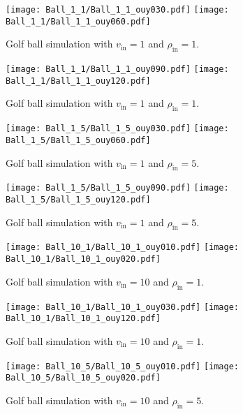 \documentclass[twocolumn]{myarticle}
\numberwithin{equation}{section}
\begin{document}
\begin{figure*}[ht]
    \centering
    \texttt{[image: Ball\_1\_1/Ball\_1\_1\_ouy030.pdf]}
    \texttt{[image: Ball\_1\_1/Ball\_1\_1\_ouy060.pdf]}
    \caption{Golf ball simulation with $ v_\text{in} = 1 $ and $ \rho_\text{in} = 1 $.}
    \label{fig:ball1}
\end{figure*}

\begin{figure*}[ht]
    \centering
    \texttt{[image: Ball\_1\_1/Ball\_1\_1\_ouy090.pdf]}
    \texttt{[image: Ball\_1\_1/Ball\_1\_1\_ouy120.pdf]}
    \caption{Golf ball simulation with $ v_\text{in} = 1 $ and $ \rho_\text{in} = 1 $.}
    \label{fig:ball2}
\end{figure*}


\begin{figure*}[ht]
    \centering
    \texttt{[image: Ball\_1\_5/Ball\_1\_5\_ouy030.pdf]}
    \texttt{[image: Ball\_1\_5/Ball\_1\_5\_ouy060.pdf]}
    \caption{Golf ball simulation with $ v_\text{in} = 1 $ and $ \rho_\text{in} = 5 $.}
    \label{fig:ball3}
\end{figure*}

\begin{figure*}[ht]
    \centering
    \texttt{[image: Ball\_1\_5/Ball\_1\_5\_ouy090.pdf]}
    \texttt{[image: Ball\_1\_5/Ball\_1\_5\_ouy120.pdf]}
    \caption{Golf ball simulation with $ v_\text{in} = 1 $ and $ \rho_\text{in} = 5 $.}
    \label{fig:ball4}
\end{figure*}


\begin{figure*}[ht]
    \centering
    \texttt{[image: Ball\_10\_1/Ball\_10\_1\_ouy010.pdf]}
    \texttt{[image: Ball\_10\_1/Ball\_10\_1\_ouy020.pdf]}
    \caption{Golf ball simulation with $ v_\text{in} = 10 $ and $ \rho_\text{in} = 1 $.}
    \label{fig:ball5}
\end{figure*}

\begin{figure*}[ht]
    \centering
    \texttt{[image: Ball\_10\_1/Ball\_10\_1\_ouy030.pdf]}
    \texttt{[image: Ball\_10\_1/Ball\_10\_1\_ouy120.pdf]}
    \caption{Golf ball simulation with $ v_\text{in} = 10 $ and $ \rho_\text{in} = 1 $.}
    \label{fig:ball6}
\end{figure*}


\begin{figure*}[ht]
    \centering
    \texttt{[image: Ball\_10\_5/Ball\_10\_5\_ouy010.pdf]}
    \texttt{[image: Ball\_10\_5/Ball\_10\_5\_ouy020.pdf]}
    \caption{Golf ball simulation with $ v_\text{in} = 10 $ and $ \rho_\text{in} = 5 $.}
    \label{fig:ball7}
\end{figure*}
\end{document}
